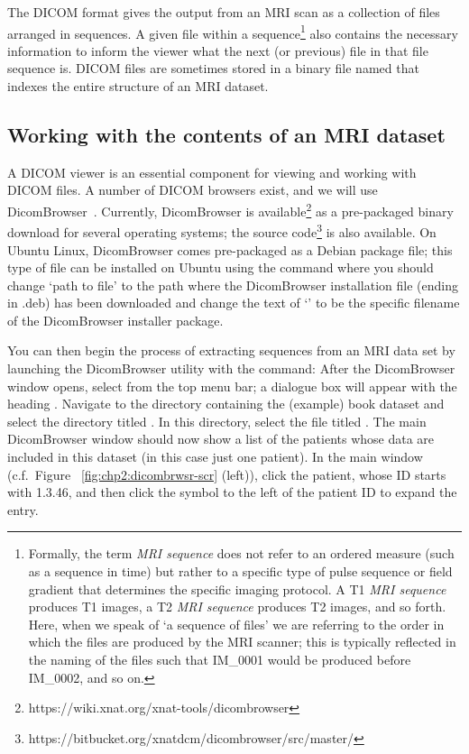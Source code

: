 The DICOM format gives the output from an MRI scan as a collection of
files arranged in sequences. A given file within a sequence\footnote{Formally, 
the term \textit{MRI sequence} does not refer to an ordered measure (such as a 
sequence in time) but rather to a specific type of pulse sequence or field 
gradient that determines the specific imaging protocol. A T1 
\textit{MRI sequence} produces T1 images, a T2 \textit{MRI sequence} produces 
T2 images, and so forth. Here, when we speak of `a sequence of files' we are 
referring to the order in which the files are produced by the MRI scanner; this 
is typically reflected in the naming of the files such that IM\_0001 would be 
produced before IM\_0002, and so on.} also contains the necessary information 
to inform the viewer what the next (or previous) file in that file sequence is. 
DICOM files are sometimes stored in a binary file named  that 
indexes the entire structure of an MRI dataset. 

\subsection{Working with the contents of an MRI dataset}
\label{sec:chp2:viewmri}

A DICOM viewer is an essential component for viewing and working with
DICOM files. A number of DICOM browsers exist, and we will use
DicomBrowser~\cite{dicombrowser}. Currently, DicomBrowser is
available\footnote{https://wiki.xnat.org/xnat-tools/dicombrowser} as a
pre-packaged binary download for several operating systems; the source
code\footnote{https://bitbucket.org/xnatdcm/dicombrowser/src/master/}
is also available. On Ubuntu Linux, DicomBrowser comes pre-packaged
as a Debian package file; this type of file can be installed on
Ubuntu using the command 
\noindent where you should change `path to file' to the path where the  
DicomBrowser installation file (ending in .deb) has been downloaded and change 
the text of `' to be the specific filename of the 
DicomBrowser installer package. 

You can then begin the process of extracting sequences from an MRI
data set by launching the DicomBrowser utility with the command:
\noindent After the DicomBrowser window opens, select
 from the top menu bar; a dialogue box
will appear with the heading . Navigate to
the directory containing the (example) book dataset and select the directory
titled \emp{\erniedicom}. In this directory, select the file titled
. The main DicomBrowser window should now show a list of
the patients whose data are included in this dataset (in this case
just one patient). In the main window (c.f.~Figure~%
\ref{fig:chp2:dicombrwsr-scr} (left)), click the patient, whose ID starts with 
1.3.46, and then click the symbol to the left of the patient ID to expand the 
entry.

